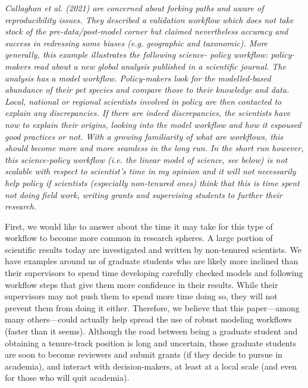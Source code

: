 \documentclass[11pt,letter]{article}
\begin{document}
\begin{mybox}
\emph{Callaghan et al. (2021) are concerned about forking paths and aware of reproducibility issues.
They described a validation workflow which does not take stock of the pre-data/post-model
corner but claimed nevertheless accuracy and success in redressing some biases (e.g.
geographic and taxonomic). More generally, this example illustrates the following science-
policy workflow: policy-makers read about a new global analysis published in a scientific
journal. The analysis has a model workflow. Policy-makers look for the modelled-based
abundance of their pet species and compare those to their knowledge and data. Local, national
or regional scientists involved in policy are then contacted to explain any discrepancies. If
there are indeed discrepancies, the scientists have now to explain their origins, looking into the
model workflow and how it espoused good practices or not. With a growing familiarity of
what are workflows, this should become more and more seamless in the long run. In the short
run however, this science-policy workflow (i.e. the linear model of science, see below) is not
scalable with respect to scientist’s time in my opinion and it will not necessarily help policy if
scientists (especially non-tenured ones) think that this is time spent not doing field work,
writing grants and supervising students to further their research.}  
\end{mybox}

First, we would like to answer about the time it may take for this type of workflow to become more common in research spheres. A large portion of scientific results today are investigated and written by non-tenured scientists. We have examples around us of graduate students who are likely more inclined than their supervisors to spend time developing carefully checked models and following workflow steps that give them more confidence in their results. While their supervisors may not push them to spend more time doing so, they will not prevent them from doing it either. Therefore, we believe that this paper---among many others---could actually help spread the use of robust modeling workflows (faster than it seems). Although the road between being a graduate student and obtaining a tenure-track position is long and uncertain, those graduate students are soon to become reviewers and submit grants (if they decide to pursue in academia), and interact with decision-makers, at least at a local scale (and even for those who will quit academia). 
\end{document}
